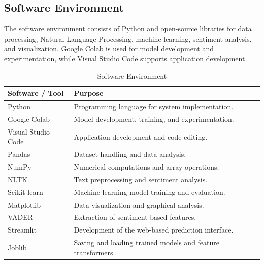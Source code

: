 \documentclass[12pt,a4paper]{report}
\begin{document}
\subsection{Software Environment}

The software environment consists of Python and
open-source libraries for data processing, Natural
Language Processing, machine learning, sentiment
analysis, and visualization. Google Colab is used
for model development and experimentation, while
Visual Studio Code supports application development.

\begin{table}[H]
\centering

\renewcommand{\arraystretch}{1.4}
\setlength{\tabcolsep}{10pt}

\begin{tabular}{|
>{\raggedright\arraybackslash}p{3.8cm}|
>{\raggedright\arraybackslash}p{8.2cm}|}
\hline
\textbf{Software / Tool} & \textbf{Purpose} \\ \hline

Python & Programming language for system implementation. \\ \hline

Google Colab & Model development, training, and experimentation. \\ \hline

Visual Studio Code & Application development and code editing. \\ \hline

Pandas & Dataset handling and data analysis. \\ \hline

NumPy & Numerical computations and array operations. \\ \hline

NLTK & Text preprocessing and sentiment analysis. \\ \hline

Scikit-learn & Machine learning model training and evaluation. \\ \hline

Matplotlib & Data visualization and graphical analysis. \\ \hline

VADER & Extraction of sentiment-based features. \\ \hline

Streamlit & Development of the web-based prediction interface. \\ \hline

Joblib & Saving and loading trained models and feature transformers. \\ \hline

\end{tabular}
\caption{Software Environment}
\label{tab:software_environment}

\end{table}
\end{document}
